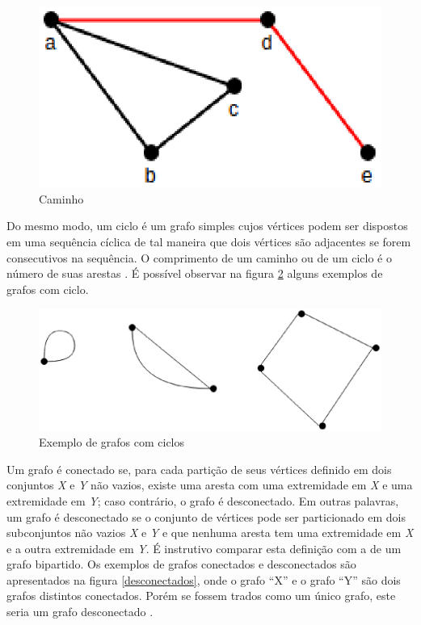 \begin{apendicesenv}
\begin{figure}[!h]
	\centering
	\includegraphics[scale=0.5]{figuras/referencial_teorico/caminho.eps}
	\caption[Caminho]{Caminho \cite{Costa:2011}}
	\label{caminho}
\end{figure}

Do mesmo modo, um ciclo é um grafo simples cujos vértices podem ser dispostos em uma sequência cíclica de tal maneira que dois vértices são adjacentes se forem consecutivos na sequência. O comprimento de um caminho ou de um ciclo é o número de suas arestas \cite{Costa:2011}. É possível observar na figura \ref{ciclos} alguns exemplos de grafos com ciclo.

\begin{figure}[!h]
	\centering
	\includegraphics[scale=0.3]{figuras/referencial_teorico/ciclos.eps}
	\caption[Exemplo de grafos com ciclos]{Exemplo de grafos com ciclos \cite{Costa:2011}}
	\label{ciclos}
\end{figure}

Um grafo é conectado se, para cada partição de seus vértices definido em dois conjuntos \textit{X} e \textit{Y} não vazios, existe uma aresta com uma extremidade em \textit{X} e uma extremidade em \textit{Y}; caso contrário, o grafo é desconectado. Em outras palavras, um grafo é desconectado se o conjunto de vértices pode ser particionado em dois subconjuntos não vazios \textit{X} e \textit{Y} e que nenhuma aresta tem uma extremidade em \textit{X} e a outra extremidade em \textit{Y}. É instrutivo comparar esta definição com a de um grafo bipartido. Os exemplos de grafos conectados e desconectados são apresentados na figura \ref{desconectados}, onde o grafo ``X'' e o grafo ``Y'' são dois grafos distintos conectados. Porém se fossem trados como um único grafo, este seria um grafo desconectado \cite{Bondy:2007}.


\end{apendicesenv}
